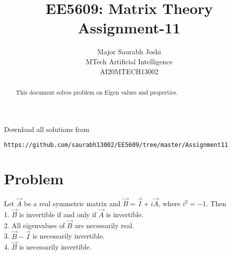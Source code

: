 \documentclass[journal,12pt,twocolumn]{IEEEtran}
\begin{document}
     \def\rightbox#1{\makebox[0in][r]{#1}}
     \def\centbox#1{\makebox[0in]{#1}}
     \def\topbox#1{\raisebox{-\baselineskip}[0in][0in]{#1}}
     \def\midbox#1{\raisebox{-0.5\baselineskip}[0in][0in]{#1}}
\vspace{3cm}
\onecolumn
\title{EE5609: Matrix Theory\\
          Assignment-11\\}
\author{Major Saurabh Joshi\\MTech Artificial Intelligence\\AI20MTECH13002 }
\maketitle
\bigskip
\renewcommand{\thefigure}{\theenumi}
\renewcommand{\thetable}{\theenumi}
\begin{abstract}
This document solves problem on Eigen values and properties.
\end{abstract}
Download all solutions from 
\begin{lstlisting}
https://github.com/saurabh13002/EE5609/tree/master/Assignment11
\end{lstlisting}
\section{Problem}
Let $\vec{A}$ be a real symmetric matrix and  $\vec{B}=\vec{I}+i\vec{A}$, where $i^2=-1$. Then\\
1. $\vec{B}$ is invertible if and only if $\vec{A}$ is invertible.\\
2. All eigenvalues of $\vec{B}$ are necessarily real.\\
3. $\vec{B}-\vec{I}$ is necessarily invertible.\\
4. $\vec{B}$ is necessarily invertible.
\end{document}
